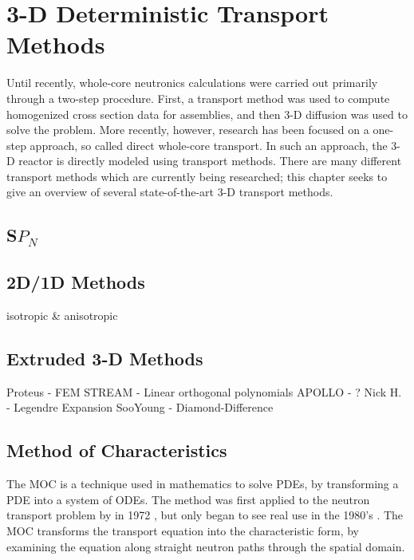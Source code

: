 \chapter{3-D Deterministic Transport Methods}{\label{ch:3-D Transport}
  
  
  
  \def\figpath{chapters/TransportMethods/figures/}
  \graphicspath{ {\figpath} }

  Until recently, whole-core neutronics calculations were carried out primarily through a two-step procedure.
  First, a transport method was used to compute homogenized cross section data for assemblies, and then 3-D diffusion was used to solve the problem.
  More recently, however, research has been focused on a one-step approach, so called direct whole-core transport.
  In such an approach, the 3-D reactor is directly modeled using transport methods.
  There are many different transport methods which are currently being researched; this chapter seeks to give an overview of several state-of-the-art 3-D transport methods.

  \section{S\texorpdfstring{$P_N$}{PN}}{\label{sec:3T:SPN}

  }

  \section{2D/1D Methods}{\label{sec:3T:2D/1D Methods}
    isotropic \& anisotropic
  }

  \section{Extruded 3-D Methods}{\label{sec:3T:Extruded 3-D Methods}
    Proteus - FEM
    STREAM - Linear orthogonal polynomials
    APOLLO - ?
    Nick H. - Legendre Expansion
    SooYoung - Diamond-Difference
  }

  \section{Method of Characteristics}{\label{sec:3T:Method of Characteristics}
    The \acf{MOC} is a technique used in mathematics to solve \acp{PDE}, by transforming a \ac{PDE} into a system of \acp{ODE}.
    The method was first applied to the neutron transport problem by \citeauthor{Askew1972} in 1972 \cite{Askew1972}, but only began to see real use in the 1980's \cite{Halsall1980}.
    The \ac{MOC} transforms the transport equation into the characteristic form, by examining the equation along straight neutron paths through the spatial domain.

}}

